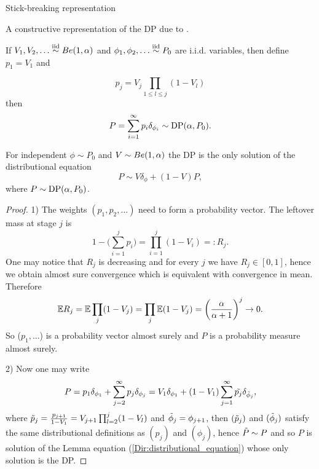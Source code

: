 {Stick-breaking representation}

A constructive representation of the DP due to \citet{sethuraman1994constructive}.
\begin{theorem}\label{theorem:sethuraman}
If $V_1, V_2, \ldots \stackrel{\mbox{\scriptsize{iid}}}{\sim} Be(1, \alpha)$ and $\phi_1, \phi_2, \ldots \stackrel{\mbox{\scriptsize{iid}}}{\sim} P_0$ are i.i.d. variables, then define $p_1=V_1$ and 

$$
p_j=V_j \prod_{1\leq l \leq j}(1-V_l)
$$ 
then 
$$
P=\sum_{i=1}^\infty p_i\delta_{\phi_i}\sim \text{DP}(\alpha, P_0).
$$
\end{theorem}



\begin{lemma}
For independent $\phi\sim P_0$ and $V\sim Be(1,\alpha)$ the DP is the only solution of the distributional equation 
\begin{equation*}\label{Dir:distributional_equation}
    P \sim V\delta_\phi + (1-V)P, 
\end{equation*}
where $P\sim \text{DP}(\alpha, P_0)$.
\end{lemma}




\begin{proof}
1) The weights $(p_1, p_2,\ldots)$ need to form a probability vector. The leftover mass at stage $j$ is 
$$
1-\bigg(\sum_{i=1}^j p_i\bigg)=\prod_{i=1}^j(1-V_i) =: R_j.
$$
One may notice that $R_j$ is decreasing and for every $j$ we have $R_j\in [0,1]$, hence we obtain almost sure convergence which is equivalent with convergence in mean. Therefore
$$
\mathbb{E} R_j=\mathbb{E} \prod_j (1-V_j)= \prod_j \mathbb{E}(1-V_j) = \bigg( \frac{\alpha}{\alpha + 1}\bigg)^j \rightarrow 0.
$$
So ($p_1, \ldots$) is a probability vector almost surely and $P$ is a probability measure almost surely. 



2) Now one may write 
$$
P=p_1\delta_{\phi_1}+\sum_{j=2}^\infty p_j\delta_{\phi_j} = V_1\delta_{\phi_1}+(1-V_1)\sum_{j=1}^\infty \Tilde{p_j}\delta_{\Tilde{\phi}_j},
$$
where $\Tilde{p}_j=\frac{p_{j+1} }{1-V_1}=V_{j+1}\prod_{l=2}^j(1-V_l)$ and $\Tilde{\phi}_j=\phi_{j+1}$, then $(\Tilde{p}_j)$ and $(\Tilde{\phi}_j)$ satisfy the same distributional definitions as $(p_j)$ and $(\phi_j)$, hence $\Tilde{P}\sim P$ and so $P$ is solution of the Lemma equation (\ref{Dir:distributional_equation}) whose only solution is the DP.
\end{proof}








